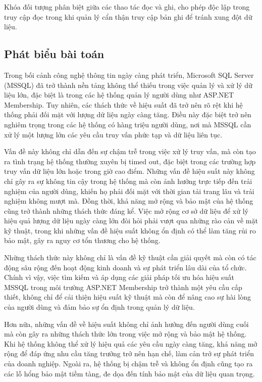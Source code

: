\documentclass{article}[14pt]
\begin{document}
{Khóa đối tượng phân biệt giữa các thao tác đọc và ghi, cho phép độc lập trong
truy cập đọc trong khi quản lý cẩn thận truy cập bản ghi để tránh xung đột dữ
liệu.


\subsection{Phát biểu bài toán}

Trong bối cảnh công nghệ thông tin ngày càng phát triển, Microsoft SQL Server (MSSQL) đã trở thành nền tảng không thể thiếu trong việc quản lý và xử lý dữ liệu lớn, đặc biệt là trong các hệ thống quản lý người dùng như ASP.NET Membership. Tuy nhiên, các thách thức về hiệu suất đã trở nên rõ rệt khi hệ thống phải đối mặt với lượng dữ liệu ngày càng tăng. Điều này đặc biệt trở nên nghiêm trọng trong các hệ thống có hàng triệu người dùng, nơi mà MSSQL cần xử lý một lượng lớn các yêu cầu truy vấn phức tạp và dữ liệu liên tục.

Vấn đề này không chỉ dẫn đến sự chậm trễ trong việc xử lý truy vấn, mà còn tạo ra tình trạng hệ thống thường xuyên bị timed out, đặc biệt trong các trường hợp truy vấn dữ liệu lớn hoặc trong giờ cao điểm. Những vấn đề hiệu suất này không chỉ gây ra sự không tin cậy trong hệ thống mà còn ảnh hưởng trực tiếp đến trải nghiệm của người dùng, khiến họ phải đối mặt với thời gian tải trang lâu và trải nghiệm không mượt mà. Đồng thời, khả năng mở rộng và bảo mật của hệ thống cũng trở thành những thách thức đáng kể. Việc mở rộng cơ sở dữ liệu để xử lý hiệu quả lượng dữ liệu ngày càng lớn đòi hỏi phải vượt qua những rào cản về mặt kỹ thuật, trong khi những vấn đề hiệu suất không ổn định có thể làm tăng rủi ro bảo mật, gây ra nguy cơ tổn thương cho hệ thống.

Những thách thức này không chỉ là vấn đề kỹ thuật cần giải quyết mà còn có tác động sâu rộng đến hoạt động kinh doanh và sự phát triển lâu dài của tổ chức. Chính vì vậy, việc tìm kiếm và áp dụng các giải pháp tối ưu hóa hiệu suất MSSQL trong môi trường ASP.NET Membership trở thành một yêu cầu cấp thiết, không chỉ để cải thiện hiệu suất kỹ thuật mà còn để nâng cao sự hài lòng của người dùng và đảm bảo sự ổn định trong quản lý dữ liệu.


Hơn nữa, những vấn đề về hiệu suất không chỉ ảnh hưởng đến người dùng cuối mà còn gây ra những thách thức lớn trong việc mở rộng và bảo mật hệ thống. Khi hệ thống không thể xử lý hiệu quả các yêu cầu ngày càng tăng, khả năng mở rộng để đáp ứng nhu cầu tăng trưởng trở nên hạn chế, làm cản trở sự phát triển của doanh nghiệp. Ngoài ra, hệ thống bị chậm trễ và không ổn định cũng tạo ra các lỗ hổng bảo mật tiềm tàng, đe dọa đến tính bảo mật của dữ liệu quan trọng.


}
\end{document}
